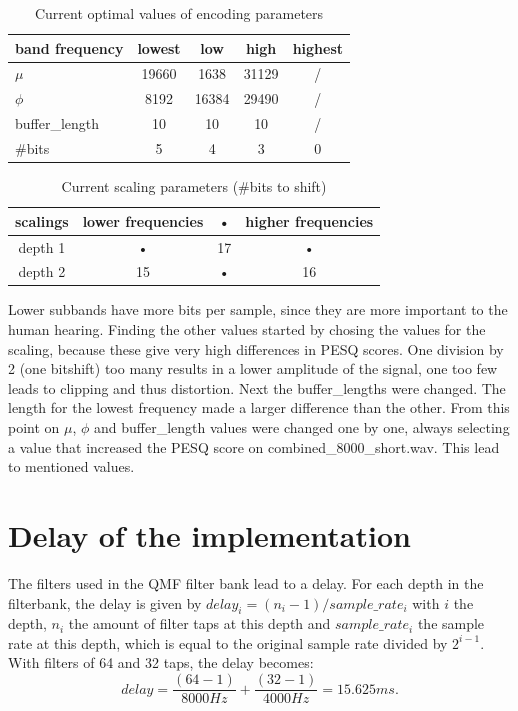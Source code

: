 \documentclass[a4paper]{article}
\begin{document}
\begin{table}[h]
\centering
\begin{tabular}{l|cccc} 
band frequency & lowest & low & high & highest \\ 
\hline 
$\mu$ & 19660 & 1638 & 31129 & / \\  
$\phi$ & 8192 & 16384 & 29490 & / \\  
buffer\_length & 10 & 10 & 10 & / \\  
\#bits & 5 & 4 & 3 & 0 \\ 
\hline 
\end{tabular}
\caption{Current optimal values of encoding parameters}
\label{tab:parametervalues}
\end{table}
\begin{table}[h]
\centering
\begin{tabular}{c|ccc}
scalings & lower frequencies & • &  higher frequencies \\ 
\hline 
depth 1 &  • & 17 & •  \\ 
depth 2 &  15 & • & 16  \\ 
\hline 
\end{tabular} 
\caption{Current scaling parameters (\#bits to shift)}
\label{tab:scalingparameters}
\end{table}
Lower subbands have more bits per sample, since they are more important to the human hearing. Finding the other values started by chosing the values for the scaling, because these give very high differences in PESQ scores. One division by 2 (one bitshift) too many results in a lower amplitude of the signal, one too few leads to clipping and thus distortion. Next the buffer\_lengths were changed. The length for the lowest frequency made a larger difference than the other. From this point on $\mu$, $\phi$ and buffer\_length values were changed one by one, always selecting a value that increased the PESQ score on combined\_8000\_short.wav. This lead to mentioned values.

\section{Delay of the implementation}
The filters used in the QMF filter bank lead to a delay. For each depth in the filterbank, the delay is given by $delay_i = (n_i-1) / sample\_rate_i$ with $i$ the depth, $n_i$ the amount of filter taps at this depth and $sample\_rate_i$ the sample rate at this depth, which is equal to the original sample rate divided by $2^{i-1}$. With filters of 64 and 32 taps, the delay becomes:
\begin{equation*}
delay = \frac{(64-1)}{8000 Hz} + \frac{(32-1)}{4000 Hz} = 15.625 ms.
\end{equation*}
\end{document}
